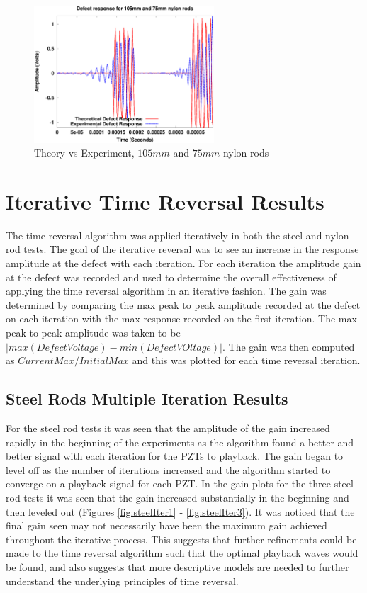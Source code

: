  \begin{figure}[ht!]
 \centering
 \includegraphics[width=0.6\textwidth]{eps_pics/nylon-3-4_Iter_th_exp.eps}
 \caption{Theory vs Experiment, $105 mm$ and $75 mm$ nylon rods
 	 \label{fig:nylonThExp3}} 
 \end{figure}
 
 
 \section{Iterative Time Reversal Results}
 The time reversal algorithm was applied iteratively in both the steel and nylon rod tests. The goal of the iterative reversal was to see an increase in the response amplitude at the defect with each iteration. For each iteration the amplitude gain at the defect was recorded and used to determine the overall effectiveness of applying the time  reversal algorithm in an iterative fashion. The gain was determined by comparing the max peak to peak amplitude recorded at the defect on each iteration with the max response recorded on the first iteration. The max peak to peak amplitude was taken to be $|max(DefectVoltage) - min(DefectVOltage)|$. The gain was then computed as $CurrentMax / InitialMax$ and this was plotted for each time reversal iteration. 
 
 \subsection{Steel Rods Multiple Iteration Results}
 For the steel rod tests it was seen that the amplitude of the gain increased rapidly in the beginning of the experiments as the algorithm found a better and better signal with each iteration for the PZTs to playback. The gain began to level off as the number of iterations increased and the algorithm started to converge on a playback signal for each PZT. In the gain plots for the three steel rod tests it was seen that the gain increased substantially in the beginning and then leveled out (Figures \ref{fig:steelIter1} - \ref{fig:steelIter3}). It was noticed that the final gain seen may not necessarily have been the maximum gain achieved throughout the iterative process. This suggests that further refinements could be made to the time reversal algorithm such that the optimal playback waves would be found, and also suggests that more descriptive models are needed to further understand the underlying principles of time reversal.

